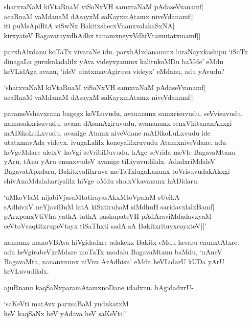 \begin{shloka}
sharxvaNaM kiVtaRnaM viSoNxVH samxraNaM pAdaseVvanamf|\\
acaRnaM vaMdanaM dAsayxM saKayxmAtamx niveVdanamf||\\
iti puMsApiRtA viSwNx BakitxshecxVnanxvalakaSxNA|\\
kirxyateV BagavatayxdhAdhx tanamxneyxV\s dhiVtamutatxmamf||
\end{shloka}

parxhAlxdanu koTaTx vivaraNe idu. parxhAlxdananunx hiraNayxkashipu `iSuTx dinagaLu gurukuladalilx yAva videyxyanunx kalitukoMDu 
baMde' eMdu keVLidAga avanu, `ideV utatxmavAgiruva videyx' eMdanu, adu yAvudu?

\begin{shloka}
`sharxvaNaM kiVtaRnaM viSoNxVH samxraNaM pAdaseVvanamf|\\
acaRnaM vaMdanaM dAsayxM saKayxmAtamx niveVdanamf||
\end{shloka}

parameVshavxrana bagegx keVLuvudu, avananunx samxrisuvudu, seVvisuvudu, namasakxrisuvudu, avana dAsanAgiruvudu, avananunx senxVhitananAnxgi mADikoLuLxvudu, avanige 
Atamx niveVdane mADikoLuLxvudu ide utatxmavAda videyx. ivugaLalilx koneyalilxruvudu AtamxniveVdane. adu heVgeMdare alelxV hoVgi seVribiDuvudu. 
hAge seVrida meVle BagavaMtanu yAru, tAnu yAru enunxvudeV avanige tiLiyuvudilalx. AdadxriMdaleV BagavatApxdaru, Bakitxyalilxruva meTaTxlugaLanunx 
toVrisuvudakAkxgi shivAnaMdalahariyalilx hiVge oMdu sholxVkavanunx hADidaru.

\begin{shloka}
`aMkoVlaM nijabiVjasaMtatirayasAkxMtoVpalaM sUcikA\\
sAdhivxV neYjaviBuM latA kiSxtiruhaM siMdhuH saridavxlalxBamf|\\
pArxponxVtiVha yathA tathA pashupateVH pAdAraviMdadavxyaM\\
ceVtoVvaqtitxrupeVtayx tiSaThxti sadA sA BakitxrituyxcayxteV||'
\end{shloka}

namamx manoVBAva hiVgidadxre adakekx Bakitx eMdu hesaru enunxtAtxre. adu heVgirabeVkeMdare moTaTx modalu BagavaMtanu baMdu, `nAneV BagavaMta, 
nananxnunx niVnu ArAdhisu' eMdu heVLidarU kUDa yArU keVLuvudilalx. 

ajuRnanu kaqSaNxparamAtamxnoDane idadxnu. hAgidadxrU-

\begin{shloka}
`saKeVti matAvx parxsaBaM yudukatxM\\
heV kaqSaNx heV yAdava heV saKeVti|'
\end{shloka}

